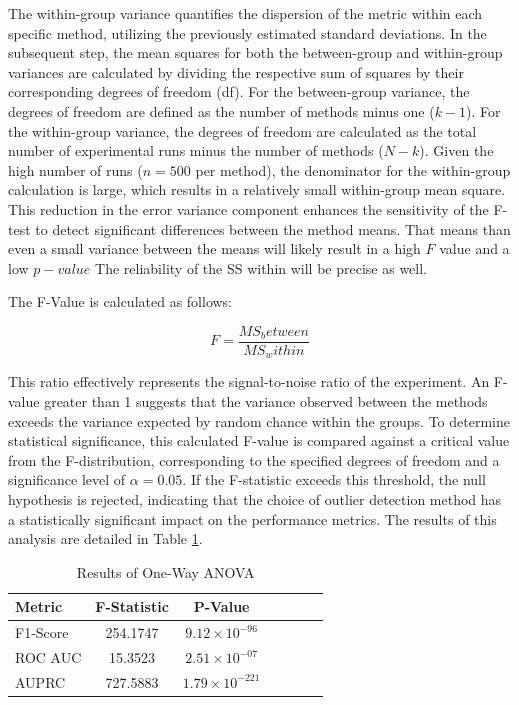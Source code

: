 The within-group variance quantifies the dispersion of the metric within each specific method, utilizing the previously estimated standard deviations. 
In the subsequent step, the mean squares for both the between-group and within-group variances are calculated by dividing the respective sum of squares by their corresponding degrees of freedom (df). 
For the between-group variance, the degrees of freedom are defined as the number of methods minus one ($k-1$). 
For the within-group variance, the degrees of freedom are calculated as the total number of experimental runs minus the number of methods ($N-k$). 
Given the high number of runs ($n=500$ per method), the denominator for the within-group calculation is large, which results in a relatively small within-group mean square. 
This reduction in the error variance component enhances the sensitivity of the F-test to detect significant differences between the method means.
That means than even a small variance between the means will likely result in a high $F$ value and a low $p-value$ 
The reliability of the SS within will be precise as well. 


The F-Value is calculated as follows:

\begin{equation}
    F = \frac{MS_between}{MS_within}
\end{equation}


This ratio effectively represents the signal-to-noise ratio of the experiment. 
An F-value greater than 1 suggests that the variance observed between the methods exceeds the variance expected by random chance within the groups. 
To determine statistical significance, this calculated F-value is compared against a critical value from the F-distribution, corresponding to the specified degrees of freedom and a significance level of $\alpha=0.05$. 
If the F-statistic exceeds this threshold, the null hypothesis is rejected, indicating that the choice of outlier detection method has a statistically significant impact on the performance metrics. 
The results of this analysis are detailed in Table \ref{tab:ANOVA}.


\begin{table}[h]
\centering
\caption{Results of One-Way ANOVA}
\label{tab:ANOVA}
\begin{tabular}{lcccccc} 
\toprule
\textbf{Metric}         & F-Statistic       & P-Value   &   \\
\midrule
F1-Score                & 254.1747          & $9.12 \times 10^{-96}$     &   \\
ROC AUC                 & 15.3523           & $2.51 \times 10^{-07}$     &   \\
AUPRC                   & 727.5883          & $1.79 \times 10^{-221}$     &   \\
\bottomrule
\end{tabular}
\end{table}


